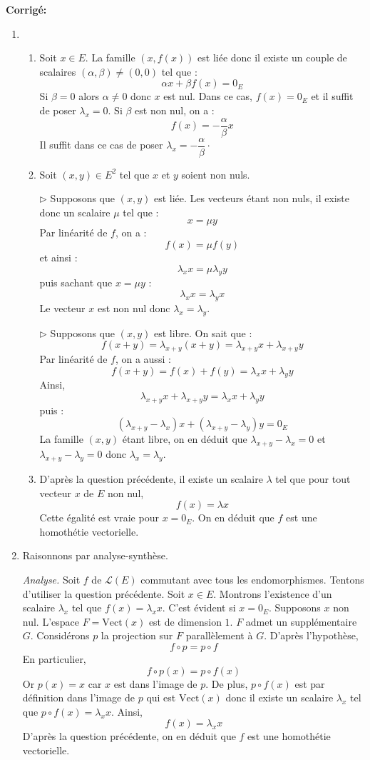 \documentclass[a4paper,twoside,french,11pt]{VcCours}
\newcommand{\corr}{\textbf{Corrigé:}}
\begin{document}
\corr 
\begin{enumerate}
\item 
\begin{enumerate}
\item Soit $x \in E$. La famille $(x, f(x))$ est liée donc il existe un couple de scalaires $(\alpha, \beta) \neq (0,0)$ tel que :
$$ \alpha x + \beta f(x) = 0_E$$
Si $\beta=0$ alors $\alpha \neq 0$ donc $x$ est nul. Dans ce cas, $f(x)=0_E$ et il suffit de poser $\lambda_x=0$. Si $\beta$ est non nul, on a :
$$ f(x) = - \dfrac{\alpha}{\beta} x$$
Il suffit dans ce cas de poser $\lambda_x = - \dfrac{\alpha}{\beta} \cdot$
\item Soit $(x,y) \in E^2$ tel que $x$ et $y$ soient non nuls.



\noindent $\rhd$ Supposons que $(x,y)$ est liée. Les vecteurs étant non nuls, il existe donc un scalaire $\mu$ tel que :
$$ x = \mu y$$
Par linéarité de $f$, on a :
$$ f(x) = \mu f(y)$$
et ainsi :
$$ \lambda_x x = \mu \lambda_y  y$$
puis sachant que $x= \mu y$ :
$$ \lambda_x x = \lambda_y  x$$
Le vecteur $x$ est non nul donc $\lambda_x = \lambda_y$.



\noindent $\rhd$ Supposons que $(x,y)$ est libre. On sait que :
$$ f(x+y) = \lambda_{x+y} (x+y) = \lambda_{x+y} x + \lambda_{x+y} y$$
Par linéarité de $f$, on a aussi :
$$ f(x+y) = f(x) + f(y) = \lambda_x x + \lambda_y y$$
Ainsi,
$$ \lambda_{x+y} x + \lambda_{x+y} y = \lambda_x x + \lambda_y y$$
puis :
$$ (\lambda_{x+y}- \lambda_x) x + (\lambda_{x+y}-\lambda_y) y =0_E$$
La famille $(x,y)$ étant libre, on en déduit que $\lambda_{x+y}- \lambda_x=0$ et $\lambda_{x+y}- \lambda_y=0$ donc $\lambda_x= \lambda_y$.
\item D'après la question précédente, il existe un scalaire $\lambda$ tel que pour tout vecteur $x$ de $E$ non nul,
$$ f(x)= \lambda x$$
Cette égalité est vraie pour $x=0_E$. On en déduit que $f$ est une homothétie vectorielle.
\end{enumerate}
\item Raisonnons par analyse-synthèse.



\noindent \textit{Analyse.} Soit $f$ de $\mathcal{L}(E)$ commutant avec tous les endomorphismes. Tentons d'utiliser la question précédente. Soit $x \in E$. Montrons l'existence d'un scalaire $\lambda_x$ tel que $f(x)= \lambda_x x$. C'est évident si $x=0_E$. Supposons $x$ non nul. L'espace $F= \textrm{Vect}(x)$ est de dimension $1$. $F$ admet un supplémentaire $G$. Considérons $p$ la projection sur $F$ parallèlement à $G$. D'après l'hypothèse,
$$ f \circ p = p \circ f$$
En particulier,
$$ f \circ p (x) = p \circ f(x)$$
Or $p(x)=x$ car $x$ est dans l'image de $p$. De plus, $p \circ f(x)$ est par définition dans l'image de $p$ qui est $\textrm{Vect}(x)$ donc il existe un scalaire $\lambda_x$ tel que $p \circ f(x) = \lambda_x x$. Ainsi,
$$ f(x) = \lambda_x x$$
D'après la question précédente, on en déduit que $f$ est une homothétie vectorielle.




\end{enumerate}
\end{document}
